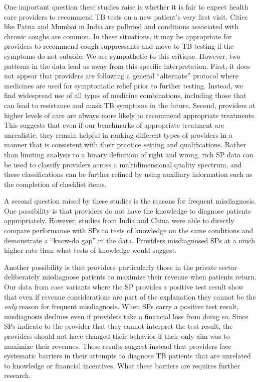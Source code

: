 \documentclass[fleqn,10pt]{wlscirep}
\begin{document}
One important question these studies raise is whether it is fair to expect health care providers to recommend TB tests on a new patient's very first visit. Cities like Patna and Mumbai in India are polluted and conditions associated with chronic coughs are common. In these situations, it may be appropriate for providers to recommend cough suppressants and move to TB testing if the symptoms do not subside. We are sympathetic to this critique. However, two patterns in the data lead us away from this specific interpretation. First, it does not appear that providers are following a general ``alternate'' protocol where medicines are used for symptomatic relief prior to further testing. Instead, we find widespread use of all types of medicine combinations, including those that can lead to resistance and mask TB symptoms in the future. Second, providers at higher levels of care are always more likely to recommend appropriate treatments. This suggests that even if our benchmarks of appropriate treatment are unrealistic, they remain helpful in ranking different types of providers in a manner that is consistent with their practice setting and qualifications. Rather than limiting analysis to a binary definition of right and wrong, rich SP data can be used to classify providers across a multidimensional quality spectrum, and these classifications can be further refined by using auxiliary information such as the completion of checklist items.

A second question raised by these studies is the reasons for frequent misdiagnosis. One possibility is that providers do not have the knowledge to diagnose patients appropriately. However, studies from India and China were able to directly compare performance with SPs to tests of knowledge on the same conditions and demonstrate a ``know-do gap'' in the data. Providers misdiagnosed SPs at a much higher rate than what tests of knowledge would suggest.

Another possibility is that providers--particularly those in the private sector--deliberately misdiagnose patients to maximize their revenue when patients return. Our data from case variants where the SP provides a positive test result show that even if revenue considerations are part of the explanation they cannot be the \textit{only} reason for frequent misdiagnosis. When SPs carry a positive test result, misdiagnosis declines even if providers take a financial loss from doing so. Since SPs indicate to the provider that they cannot interpret the test result, the providers should not have changed their behavior if their only aim was to maximize their revenues. These results suggest instead that providers face systematic barriers in their attempts to diagnose TB patients that are unrelated to knowledge or financial incentives. What these barriers are requires further research.
\end{document}
